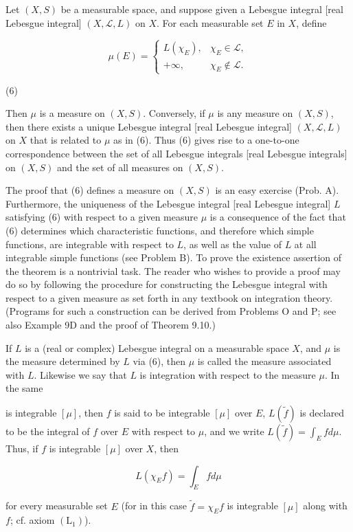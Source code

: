 Let $(X, S)$ be a measurable space, and suppose given a Lebesgue integral [real Lebesgue integral] $(X, \mathcal{L}, L)$ on $X$. For each measurable set $E$ in $X$, define

$$\mu(E) = \begin{cases} L(\chi_E), & \chi_E \in \mathcal{L}, \\ +\infty, & \chi_E \notin \mathcal{L}. \end{cases}$$

(6)

Then $\mu$ is a measure on $(X, S)$. Conversely, if $\mu$ is any measure on $(X, S)$, then there exists a unique Lebesgue integral [real Lebesgue integral] $(X, \mathcal{L}, L)$ on $X$ that is related to $\mu$ as in (6). Thus (6) gives rise to a one-to-one correspondence between the set of all Lebesgue integrals [real Lebesgue integrals] on $(X, S)$ and the set of all measures on $(X, S)$.

The proof that (6) defines a measure on $(X, S)$ is an easy exercise (Prob. A). Furthermore, the uniqueness of the Lebesgue integral [real Lebesgue integral] $L$ satisfying (6) with respect to a given measure $\mu$ is a consequence of the fact that (6) determines which characteristic functions, and therefore which simple functions, are integrable with respect to $L$, as well as the value of $L$ at all integrable simple functions (see Problem B). To prove the existence assertion of the theorem is a nontrivial task. The reader who wishes to provide a proof may do so by following the procedure for constructing the Lebesgue integral with respect to a given measure as set forth in any textbook on integration theory. (Programs for such a construction can be derived from Problems O and P; see also Example 9D and the proof of Theorem 9.10.)

If $L$ is a (real or complex) Lebesgue integral on a measurable space $X$, and $\mu$ is the measure determined by $L$ via (6), then $\mu$ is called the measure associated with $L$. Likewise we say that $L$ is integration with respect to the measure $\mu$. In the same

is integrable $[\mu]$, then $f$ is said to be integrable $[\mu]$ over $E$, $L(\tilde{f})$ is declared to be the integral of $f$ over $E$ with respect to $\mu$, and we write $L(\tilde{f}) = \int_E f d\mu$. Thus, if $f$ is integrable $[\mu]$ over $X$, then

$$L(\chi_E f) = \int_E f d\mu$$

for every measurable set $E$ (for in this case $\tilde{f} = \chi_E f$ is integrable $[\mu]$ along with $f$; cf. axiom $(\mathrm{L}_1)$).

